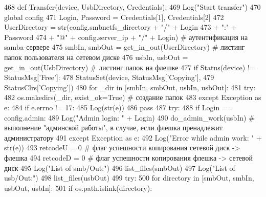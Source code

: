 \begin{DoxyCode}
468 \textcolor{keyword}{def }Transfer(device, UsbDirectory, Credentials):
469     Log(\textcolor{stringliteral}{"Start transfer"})
470     \textcolor{keyword}{global} config
471     Login, Password = Credentials[1], Credentials[2]
472     UserDirectory = str(config.smbnetfs\_directory + \textcolor{stringliteral}{"/"} + Login
473                         + \textcolor{stringliteral}{":"} + Password
474                         + \textcolor{stringliteral}{"@"} + config.server\_ip + \textcolor{stringliteral}{"/"} + Login) \textcolor{comment}{# аутентификация на samba-сервере}
475     smbIn, smbOut = get\_in\_out(UserDirectory) \textcolor{comment}{# листинг папок пользователя на сетевом диске}
476     usbIn, usbOut = get\_in\_out(UsbDirectory) \textcolor{comment}{# листинг папок на флешке}
477     \textcolor{keywordflow}{if} Status(device) != StatusMsg[\textcolor{stringliteral}{'Free'}]:
478         StatusSet(device, StatusMsg[\textcolor{stringliteral}{'Copying'}],
479                   StatusClrs[\textcolor{stringliteral}{'Copying'}])
480     \textcolor{keywordflow}{for} \_dir \textcolor{keywordflow}{in} [smbIn, smbOut, usbIn, usbOut]:
481         \textcolor{keywordflow}{try}:
482             os.makedirs(\_dir, exist\_ok=\textcolor{keyword}{True}) \textcolor{comment}{# создание папок}
483         \textcolor{keywordflow}{except} Exception \textcolor{keyword}{as} e:
484             \textcolor{keywordflow}{if} e.errno != 17:
485                 Log(str(e))
486             \textcolor{keywordflow}{pass}
487     \textcolor{keywordflow}{try}:
488         \textcolor{keywordflow}{if} Login == config.admin:
489             Log(\textcolor{stringliteral}{"Admin login: "} + Login)
490             do\_admin\_work(usbIn) \textcolor{comment}{# выполнение "админской работы", в случае, если флешка пренадлежит
       администратору}
491     \textcolor{keywordflow}{except} Exception \textcolor{keyword}{as} e:
492         Log(\textcolor{stringliteral}{"Error while admin work: "} + str(e))
493     retcodeU = 0 \textcolor{comment}{# флаг успешности копирования сетевой диск -> флешка}
494     retcodeD = 0 \textcolor{comment}{# флаг успешности копирования флешка -> сетевой диск}
495     Log(\textcolor{stringliteral}{"List of smb/Out:"})
496     list\_files(smbOut)
497     Log(\textcolor{stringliteral}{"List of usb/Out:"})
498     list\_files(usbOut)
499     \textcolor{keywordflow}{try}:
500         \textcolor{keywordflow}{for} directory \textcolor{keywordflow}{in} [smbOut, smbIn, usbOut, usbIn]:
501             \textcolor{keywordflow}{if} os.path.islink(directory):

\end{DoxyCode}
